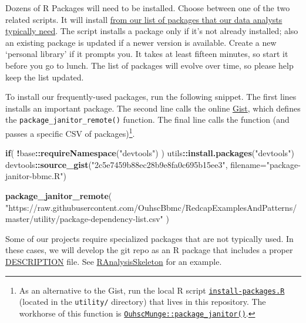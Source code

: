 \documentclass[
]{book}
\newenvironment{Shaded}{\begin{snugshade}}{\end{snugshade}}
\newcommand{\ControlFlowTok}[1]{\textcolor[rgb]{0.13,0.29,0.53}{\textbf{#1}}}
\newcommand{\DataTypeTok}[1]{\textcolor[rgb]{0.13,0.29,0.53}{#1}}
\newcommand{\KeywordTok}[1]{\textcolor[rgb]{0.13,0.29,0.53}{\textbf{#1}}}
\newcommand{\NormalTok}[1]{#1}
\newcommand{\OperatorTok}[1]{\textcolor[rgb]{0.81,0.36,0.00}{\textbf{#1}}}
\newcommand{\StringTok}[1]{\textcolor[rgb]{0.31,0.60,0.02}{#1}}
\begin{document}
Dozens of R Packages will need to be installed. Choose between one of the two related scripts. It will install \href{https://github.com/OuhscBbmc/RedcapExamplesAndPatterns/blob/master/utility/package-dependency-list.csv}{from our list of packages that our data analysts typically need}. The script installs a package only if it's not already installed; also an existing package is updated if a newer version is available. Create a new `personal library' if it prompts you. It takes at least fifteen minutes, so start it before you go to lunch. The list of packages will evolve over time, so please help keep the list updated.

To install our frequently-used packages, run the following snippet. The first lines installs an important package. The second line calls the online \href{https://gist.github.com/wibeasley/2c5e7459b88ec28b9e8fa0c695b15ee3}{Gist}, which defines the \texttt{package\_janitor\_remote()} function. The final line calls the function (and passes a specific CSV of packages)\footnote{As an alternative to the Gist, run the local R script \href{https://github.com/OuhscBbmc/RedcapExamplesAndPatterns/blob/master/utility/install-packages.R}{\texttt{install-packages.R}} (located in the \texttt{utility/} directory) that lives in this repository. The workhorse of this function is \href{https://github.com/OuhscBbmc/OuhscMunge/blob/master/R/package-janitor.R}{\texttt{OuhscMunge::package\_janitor()}}.}.

\begin{Shaded}
\begin{Highlighting}[]
\ControlFlowTok{if}\NormalTok{( }\OperatorTok{!}\NormalTok{base}\OperatorTok{::}\KeywordTok{requireNamespace}\NormalTok{(}\StringTok{"devtools"}\NormalTok{) ) utils}\OperatorTok{::}\KeywordTok{install.packages}\NormalTok{(}\StringTok{"devtools"}\NormalTok{)}
\NormalTok{devtools}\OperatorTok{::}\KeywordTok{source\_gist}\NormalTok{(}\StringTok{"2c5e7459b88ec28b9e8fa0c695b15ee3"}\NormalTok{, }\DataTypeTok{filename=}\StringTok{"package{-}janitor{-}bbmc.R"}\NormalTok{)}

\KeywordTok{package\_janitor\_remote}\NormalTok{(}
  \StringTok{"https://raw.githubusercontent.com/OuhscBbmc/RedcapExamplesAndPatterns/master/utility/package{-}dependency{-}list.csv"}
\NormalTok{)        }
\end{Highlighting}
\end{Shaded}

Some of our projects require specialized packages that are not typically used. In these cases, we will develop the git repo as an R package that includes a proper \href{http://r-pkgs.had.co.nz/description.html}{DESCRIPTION} file. See \href{https://github.com/wibeasley/RAnalysisSkeleton/blob/master/DESCRIPTION}{RAnalysisSkeleton} for an example.
\end{document}
